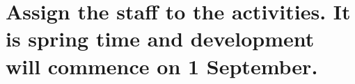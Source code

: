 \documentclass[Main]{subfiles}
\begin{document}
\section{Assign the staff to the activities. It is spring time and development will commence on 1 September.}
\end{document}
